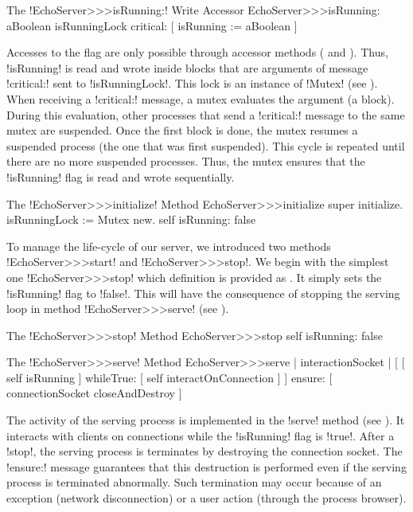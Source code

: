 \documentclass[a4paper,10pt,twoside]{book}
\begin{document}
\begin{method}{The \ct!EchoServer>>>isRunning:! Write Accessor}
EchoServer>>>isRunning: aBoolean
	isRunningLock critical: [ isRunning := aBoolean ]
\end{method}

Accesses to the flag are only possible through accessor methods ( and ).
Thus, \ct!isRunning! is read and wrote inside blocks that are arguments of message \ct!critical:! sent to \ct!isRunningLock!.
This lock is an instance of \ct!Mutex! (see ).
When receiving a \ct!critical:! message, a mutex evaluates the argument (a block).
During this evaluation, other processes that send a \ct!critical:! message to the same mutex are suspended.
Once the first block is done, the mutex resumes a suspended process (the one that was first suspended).
This cycle is repeated until there are no more suspended processes.
Thus, the mutex ensures that the \ct!isRunning! flag is read and wrote sequentially.

\begin{method}{The \ct!EchoServer>>>initialize! Method}
EchoServer>>>initialize 
	super initialize.
	isRunningLock := Mutex new.
	self isRunning: false
\end{method}

To manage the life-cycle of our server, we introduced two methods \ct!EchoServer>>>start! and \ct!EchoServer>>>stop!.
We begin with the simplest one \ct!EchoServer>>>stop! which definition is provided as .
It simply sets the \ct!isRunning! flag to \ct!false!.
This will have the consequence of stopping the serving loop in method \ct!EchoServer>>>serve! (see ). 

\begin{method}{The \ct!EchoServer>>>stop! Method}
EchoServer>>>stop
	self isRunning: false
\end{method}

\begin{method}{The \ct!EchoServer>>>serve! Method}
EchoServer>>>serve
	| interactionSocket |
	[ [ self isRunning ]
		whileTrue: [ self interactOnConnection ] ]
		ensure: [ connectionSocket closeAndDestroy ]
\end{method}

The activity of the serving process is implemented in the \ct!serve! method (see ).
It interacts with clients on connections while the \ct!isRunning! flag is \ct!true!.
After a \ct!stop!, the serving process is terminates by destroying the connection socket.
The \ct!ensure:! message guarantees that this destruction is performed even if the serving process is terminated abnormally. 
Such termination may occur because of an exception (\eg network disconnection) or a user action (\eg through the process browser).   
\end{document}
